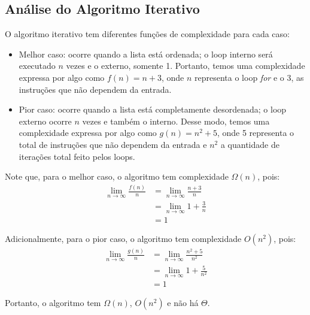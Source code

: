 \subsection{Análise do Algoritmo Iterativo}
O algoritmo iterativo tem diferentes funções de complexidade para cada caso:
\begin{itemize}
  \item Melhor caso: ocorre quando a lista está ordenada; o loop interno será executado $n$ vezes e o externo, somente 1. Portanto, temos uma complexidade expressa por algo como $f(n) = n + 3$, onde $n$ representa o loop \textit{for} e o 3, as instruções que não dependem da entrada.
  \item Pior caso: ocorre quando a lista está completamente desordenada; o loop externo ocorre $n$ vezes e também o interno. Desse modo, temos uma complexidade expressa por algo como $g(n) = n^2 + 5$, onde 5 representa o total de instruções que não dependem da entrada e $n^2$ a quantidade de iterações total feito pelos loops.
\end{itemize}

Note que, para o melhor caso, o algoritmo tem complexidade $\Omega(n)$, pois:
\begin{align*}
    \lim_{n\to\infty} \frac{f(n)}{n} &= \lim_{n\to\infty} \frac{n + 3}{n} \\
    &= \lim_{n\to\infty} 1 + \frac{3}{n} \\ 
    &= 1 
\end{align*}

Adicionalmente, para o pior caso, o algoritmo tem complexidade $O(n^2)$, pois:
\begin{align*}
    \lim_{n\to\infty} \frac{g(n)}{n} &= \lim_{n\to\infty} \frac{n^2 + 5}{n^2} \\
    &= \lim_{n\to\infty} 1 + \frac{5}{n^2} \\ 
    &= 1 
\end{align*}

Portanto, o algoritmo tem $\Omega(n)$, $O(n^2)$ e não há $\Theta$.
